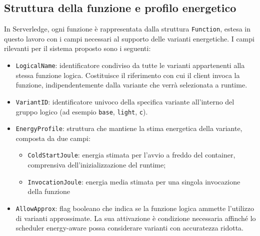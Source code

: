 \subsection{Struttura della funzione e profilo energetico}

In Serverledge, ogni funzione è rappresentata dalla struttura 
\texttt{Function}, estesa in questo lavoro con i campi necessari al 
supporto delle varianti energetiche. I campi rilevanti per il sistema 
proposto sono i seguenti:

\begin{itemize}
    \item \texttt{LogicalName}: identificatore condiviso da tutte le 
    varianti appartenenti alla stessa funzione logica. Costituisce 
    il riferimento con cui il client invoca la funzione, 
    indipendentemente dalla variante che verrà selezionata a runtime.

    \item \texttt{VariantID}: identificatore univoco della specifica 
    variante all'interno del gruppo logico (ad esempio \texttt{base}, 
    \texttt{light}, \texttt{c}).

    \item \texttt{EnergyProfile}: struttura che mantiene la stima 
    energetica della variante, composta da due campi:
    \begin{itemize}
        \item \texttt{ColdStartJoule}: energia stimata per l'avvio a 
        freddo del container, comprensiva dell'inizializzazione del 
        runtime;
        \item \texttt{InvocationJoule}: energia media stimata per una 
        singola invocazione della funzione
    \end{itemize}
    \item \texttt{AllowApprox}: flag booleano che indica se la funzione 
    logica ammette l'utilizzo di varianti approssimate. La sua 
    attivazione è condizione necessaria affinché lo scheduler 
    energy-aware possa considerare varianti con accuratezza ridotta.
\end{itemize}

